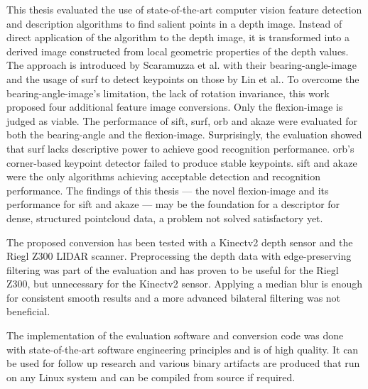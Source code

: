 This thesis evaluated the use of state-of-the-art computer vision feature detection and description algorithms to find salient points in a depth image.
Instead of direct application of the algorithm to the depth image, it is transformed into a derived image constructed from local geometric properties of the depth values.
The approach is introduced by Scaramuzza et al.\cite{scaramuzza_iros2007} with their \gls{bearing-angle-image} and the usage of \acrshort{surf} to detect keypoints on those by Lin et al.\cite{lin_easp2017}.
To overcome the \gls{bearing-angle-image}'s limitation, the lack of rotation invariance, this work proposed four additional feature image conversions.
Only the \gls{flexion-image} is judged as viable.
The performance of \acrshort{sift}, \acrshort{surf}, \acrshort{orb} and \acrshort{akaze} were evaluated for both the \gls{bearing-angle} and the \gls{flexion-image}.
Surprisingly, the evaluation showed that \acrshort{surf} lacks descriptive power to achieve good recognition performance.
\acrshort{orb}'s corner-based keypoint detector failed to produce stable keypoints.
\acrshort{sift} and \acrshort{akaze} were the only algorithms achieving acceptable detection and recognition performance.
The findings of this thesis --- the novel \gls{flexion-image} and its performance for \acrshort{sift} and \acrshort{akaze} --- may be the foundation for a descriptor for dense, structured pointcloud data, a problem not solved satisfactory yet.

The proposed conversion has been tested with a Kinectv2 depth sensor and the Riegl Z300 \acrshort{LIDAR} scanner.
Preprocessing the depth data with edge-preserving filtering was part of the evaluation and has proven to be useful for the Riegl Z300, but unnecessary for the Kinectv2 sensor.
Applying a median blur is enough for consistent smooth results and a more advanced bilateral filtering was not beneficial.

The implementation of the evaluation software and conversion code was done with state-of-the-art software engineering principles and is of high quality.
It can be used for follow up research and various binary artifacts are produced that run on any Linux system and can be compiled from source if required.
